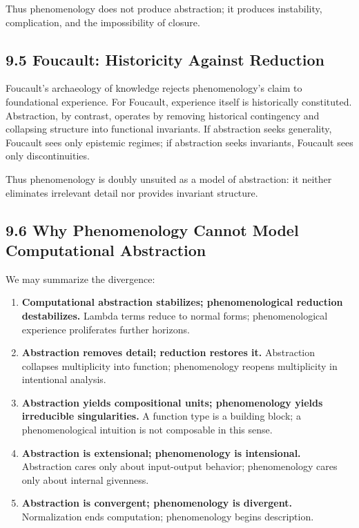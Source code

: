 \documentclass[11pt,letterpaper]{article}
\begin{document}
Thus phenomenology does not produce abstraction; it produces instability, complication, and the impossibility of closure.

\subsection{9.5 Foucault: Historicity Against Reduction}
Foucault’s archaeology of knowledge \parencite{Foucault1970} rejects phenomenology’s claim to foundational experience. For Foucault, experience itself is historically constituted. Abstraction, by contrast, operates by removing historical contingency and collapsing structure into functional invariants. If abstraction seeks generality, Foucault sees only epistemic regimes; if abstraction seeks invariants, Foucault sees only discontinuities.

Thus phenomenology is doubly unsuited as a model of abstraction: it neither eliminates irrelevant detail nor provides invariant structure.

\subsection{9.6 Why Phenomenology Cannot Model Computational Abstraction}

We may summarize the divergence:

\begin{enumerate}[itemsep=0.5em]
    \item \textbf{Computational abstraction stabilizes; phenomenological reduction destabilizes.}  
    Lambda terms reduce to normal forms; phenomenological experience proliferates further horizons.

    \item \textbf{Abstraction removes detail; reduction restores it.}  
    Abstraction collapses multiplicity into function; phenomenology reopens multiplicity in intentional analysis.

    \item \textbf{Abstraction yields compositional units; phenomenology yields irreducible singularities.}  
    A function type is a building block; a phenomenological intuition is not composable in this sense.

    \item \textbf{Abstraction is extensional; phenomenology is intensional.}  
    Abstraction cares only about input-output behavior; phenomenology cares only about internal givenness.

    \item \textbf{Abstraction is convergent; phenomenology is divergent.}  
    Normalization ends computation; phenomenology begins description.
\end{enumerate}
\end{document}
